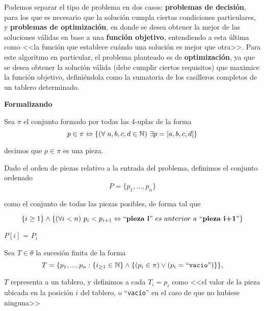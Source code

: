 \documentclass[11pt, a4paper, twoside]{article}
\begin{document}
Podemos separar el tipo de problema en dos casos: \textbf{problemas de
decisión}, para los que es necesario que la solución cumpla ciertas condiciones
particulares, y \textbf{problemas de optimización}, en donde se desea obtener la
mejor de las soluciones válidas en base a una \textbf{función objetivo},
entendiendo a esta última como <<la función que establece cuándo una solución es
mejor que otra>>. Para este algoritmo en particular, el problema planteado es de
\textbf{optimización}, ya que se desea obtener la solución válida (debe cumplir
ciertos requisitos) que maximice la función objetivo, definiéndola como la
sumatoria de los casilleros completos de un tablero determinado.

\begin{center}
\textbf{Formalizando}
\end{center}


\begin{notacion}
Sea $\pi$ el conjunto formado por todas las 4-uplas de la forma
\[
p \in \pi \Leftrightarrow \{(\forall~{a, b, c, d} \in \mathbb{N})~\exists p = [a, b, c, d]\}
\]
\begin{flushright}
decimos que $p \in \pi$ es una pieza.
\end{flushright}
\end{notacion}



\begin{definicion}

Dado el orden de piezas relativo a la entrada del problema, definimos el
conjunto ordenado
\[
P = \{p_1, ..., p_n\}
\]
\begin{center}
como el conjunto de todas las piezas posibles, de forma tal que 
\end{center}
\[
\{i\geq 1\} \land \{(\forall{i<n})\ p_i < p_{i+1} \Leftrightarrow ``\textbf{pieza~i}"~es~anterior~a~``\textbf{pieza~i+1}"\}
\]

\end{definicion}
\begin{notacion}

$P[i]$ = $P_i$

\end{notacion}



\begin{definicion}

Sea $T \in \theta$ la sucesión finita de la forma 
\[
T = \{p_1, ..., p_n : \{i_{\geq 1}\in\mathbb{N}\} \land \{(p_i \in \pi) \lor (p_i = ``\texttt{vacio}")\}\},
\]

$T$ representa a un tablero, y definimos a cada $T_i = p_i$ como <<el valor de
la pieza ubicada en la posición $i$ del tablero, o ``\texttt{vacío}'' en el caso de que
no hubiese ninguna>>

\end{definicion}
\end{document}
